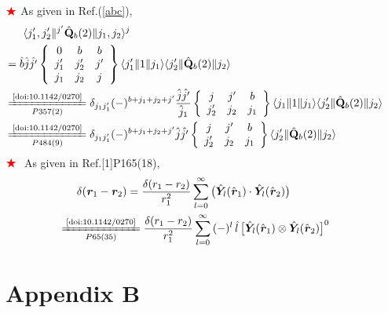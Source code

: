 \documentclass[master]{shnuthesis}
\newcommand{\bmr}{\textbf{\textit{r}}}
\newcommand{\il}{\!\!\!\!\!\!\!\!\!\!}
\newcommand{\zdydh}{\xlongequal}
\newcommand{\redstar}{{\color{red} \bigstar}\,\,}
\begin{document}
${\color{red} \bigstar}$ As given in Ref.(\ref{abc}),
\begin{align}
    & \langle j_{1}^\prime, j_{2}^\prime\|^{j^{\prime}} \hat{\mathbf{Q}}_{b}(2)\|j_{1}, j_{2} \rangle^{j}  \notag\\
    &\il = \hat{b}\hat{j}\hat{j^\prime}
        \left\{\begin{array}{ccc}
        0 & b & b \\
        j_{1}^\prime & j_{2}^\prime & j^{\prime} \\
        j_{1} & j_{2} & j
        \end{array}\right\}
    \langle j_{1}^\prime\|1\| j_{1}\rangle \langle j_{2}^\prime\|\hat{\mathbf{Q}}_{b}(2)\| j_{2}\rangle \\
    &\il \zdydh[P357(2)]{\text{\cite{doi:10.1142/0270}}}  \delta_{j_1 j_1^\prime}(-)^{b+j_1+j_2+j^\prime} \frac{\hat{j}\hat{j^\prime}}{\hat{j}_1}
        \left\{\begin{array}{ccc}
        j & j^\prime & b \\
        j_{2}^\prime & j_{2} & j_1
        \end{array}\right\}
    \langle j_{1}\|1\| j_{1}\rangle \langle j_{2}^\prime\|\hat{\mathbf{Q}}_{b}(2)\| j_{2}\rangle \\
    &\il \zdydh[P484(9)]{\text{\cite{doi:10.1142/0270}}} \delta_{j_1 j_1^\prime}(-)^{b+j_1+j_2+j^\prime} \hat{j}\hat{j^\prime}
        \left\{\begin{array}{ccc}
        j & j^\prime & b \\
        j_{2}^\prime & j_{2} & j_1
        \end{array}\right\}
    \langle j_{2}^\prime\|\hat{\mathbf{Q}}_{b}(2)\| j_{2}\rangle \label{j1j2-2}
\end{align}
$\redstar$ As given in Ref.[1]P165(18),
\begin{align}
    & \delta(\bmr_1-\bmr_2) = \frac{\delta(r_1-r_2)}{r_1^2}\sum_{l=0}^\infty \big(\hat{\bm{Y}}_l(\hat{\bmr}_1) \cdot \hat{\bm{Y}}_l(\hat{\bmr}_2)\big) \\
    &\il \zdydh[P65(35)]{\text{\cite{doi:10.1142/0270}}} \frac{\delta(r_1-r_2)}{r_1^2}\sum_{l=0}^\infty \,(-)^l\,\hat{l}\,\big[\hat{\bm{Y}}_l(\hat{\bmr}_1) \otimes \hat{\bm{Y}}_l(\hat{\bmr}_2)\big]^0  \label{delta-r1r2}
\end{align}



\backmatter  %
\appendix
\setcounter{equation}{0}
\chapter{Appendix B}
\renewcommand{\thesection}{B.\arabic{section}} %
\renewcommand{\theequation}{B-\arabic{equation}} %
\renewcommand{\thefigure}{B.\arabic{figure}} %
\setcounter{table}{0}
\renewcommand{\thetable}{B.\arabic{table}} %
\end{document}
